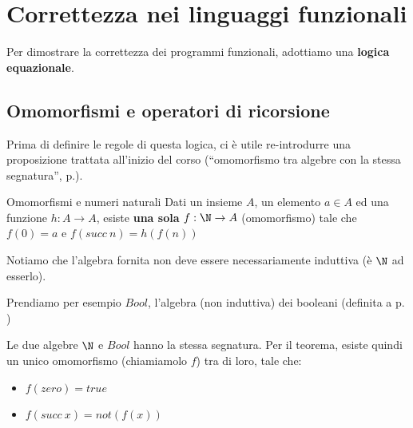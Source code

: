 \documentclass[a4paper,11pt]{report}
\begin{document}
\section{Correttezza nei linguaggi funzionali}
Per dimostrare la correttezza dei programmi funzionali, adottiamo una \textbf{logica equazionale}.

\subsection{Omomorfismi e operatori di ricorsione}
Prima di definire le regole di questa logica, ci è utile re-introdurre una proposizione trattata all'inizio del corso (``omomorfismo tra algebre con la stessa segnatura'', p.\pageref{teo-om}). 

\begin{propframe}{Omomorfismi e numeri naturali}{}
    \label{prop1}
    Dati un insieme \( A \), un elemento \( a \in A \) ed una funzione \( h: A\to A \), esiste \textbf{una sola} \( f:\N \to A \) (omomorfismo) tale che \( f(0)=a \) e \( f(succ \ n) = h(f(n))\)
\end{propframe}

\begin{gframe}{}
Notiamo che l'algebra fornita non deve essere necessariamente induttiva (è \( \N \) ad esserlo).
\end{gframe}

Prendiamo per esempio \( Bool \), l'algebra (non induttiva) dei booleani (definita a p. \pageref{Bool})

Le due algebre \( \N \) e \( Bool \) hanno la stessa segnatura. Per il teorema, esiste quindi un unico omomorfismo (chiamiamolo \( f \)) tra di loro, tale che:
\begin{itemize}
    \item \( f(zero) = true \)
    \item \( f(succ \ x ) = not(f(x)) \)
\end{itemize}

\begin{centering}
    

\end{centering}
\end{document}
